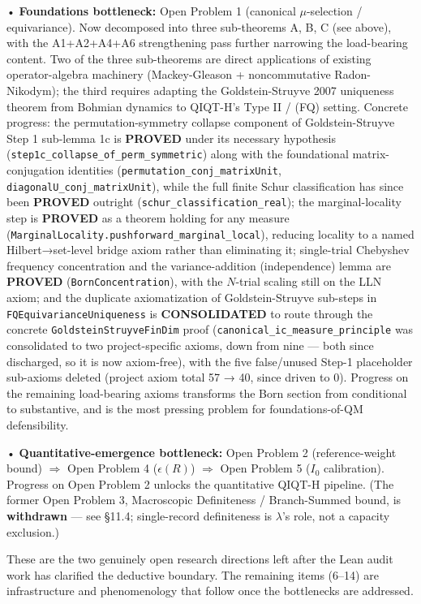 \documentclass[11pt,a4paper]{article}
\begin{document}
  • \textbf{Foundations bottleneck:} Open Problem 1 (canonical $\mu$-selection / equivariance). Now decomposed into three sub-theorems A, B, C (see above), with the A1+A2+A4+A6 strengthening pass further narrowing the load-bearing content. Two of the three sub-theorems are direct applications of existing operator-algebra machinery (Mackey-Gleason + noncommutative Radon-Nikodym); the third requires adapting the Goldstein-Struyve 2007 uniqueness theorem from Bohmian dynamics to QIQT-H's Type II / (FQ) setting. Concrete progress: the permutation-symmetry collapse component of Goldstein-Struyve Step 1 sub-lemma 1c is \textbf{PROVED} under its necessary hypothesis (\texttt{step1c\_collapse\_of\_perm\_symmetric}) along with the foundational matrix-conjugation identities (\texttt{permutation\_conj\_matrixUnit}, \texttt{diagonalU\_conj\_matrixUnit}), while the full finite Schur classification has since been \textbf{PROVED} outright (\texttt{schur\_classification\_real}); the marginal-locality step is \textbf{PROVED} as a theorem holding for any measure (\texttt{MarginalLocality.pushforward\_marginal\_local}), reducing locality to a named Hilbert→set-level bridge axiom rather than eliminating it; single-trial Chebyshev frequency concentration and the variance-addition (independence) lemma are \textbf{PROVED} (\texttt{BornConcentration}), with the $N$-trial scaling still on the LLN axiom; and the duplicate axiomatization of Goldstein-Struyve sub-steps in \texttt{FQEquivarianceUniqueness} is \textbf{CONSOLIDATED} to route through the concrete \texttt{GoldsteinStruyveFinDim} proof (\texttt{canonical\_ic\_measure\_principle} was consolidated to two project-specific axioms, down from nine — both since discharged, so it is now axiom-free), with the five false/unused Step-1 placeholder sub-axioms deleted (project axiom total 57 → 40, since driven to 0). Progress on the remaining load-bearing axioms transforms the Born section from conditional to substantive, and is the most pressing problem for foundations-of-QM defensibility.

  • \textbf{Quantitative-emergence bottleneck:} Open Problem 2 (reference-weight bound) $\Rightarrow$ Open Problem 4 ($\epsilon(R)$) $\Rightarrow$ Open Problem 5 ($I_0$ calibration). Progress on Open Problem 2 unlocks the quantitative QIQT-H pipeline. (The former Open Problem 3, Macroscopic Definiteness / Branch-Summed bound, is \textbf{withdrawn} — see §11.4; single-record definiteness is $\lambda$'s role, not a capacity exclusion.)

These are the two genuinely open research directions left after the Lean audit work has clarified the deductive boundary. The remaining items (6–14) are infrastructure and phenomenology that follow once the bottlenecks are addressed.
\end{document}
